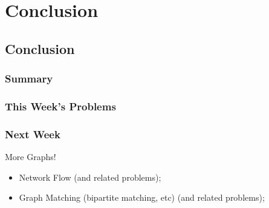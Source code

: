 \documentclass{beamer}
\begin{document}



\section{Conclusion}
\subsection{Conclusion}
\begin{frame}
  \frametitle{Summary}
\end{frame}

\begin{frame}
  \frametitle{This Week's Problems}
\end{frame}

\begin{frame}
  \frametitle{Next Week}
  More Graphs!
  \begin{itemize}
  \item Network Flow (and related problems);
  \item Graph Matching (bipartite matching, etc) (and related problems);
  \end{itemize}
\end{frame}

\end{document}
